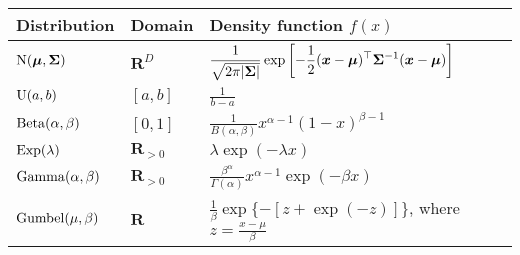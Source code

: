 \begingroup
\renewcommand*{\arraystretch}{1.5}
\begin{tabularx}{\linewidth}{llX}
  Distribution & Domain & Density function $f(x)$ \\
  \midrule
  \rule{0pt}{5ex}%
  $\mathrm{N}( \bm{\mu}, \bm{\Sigma} )$
    & $\mathbf{R}^D$
    & $\displaystyle \frac{1}{\sqrt{2 \pi \lvert\bm{\Sigma}\rvert}}
        \exp \left[ -\frac{1}{2} (\bm{x} - \bm{\mu})^\top \bm{\Sigma}^{-1} (\bm{x} - \bm{\mu}) \right]$ \\
  \rule{0pt}{5ex}%
  $\mathrm{U}( a, b )$
    & $[a, b]$
    & $\displaystyle \frac{1}{b - a}$ \\
  \rule{0pt}{5ex}%
  $\mathrm{Beta}( \alpha, \beta )$
    & $[0, 1]$
    & $\displaystyle \frac{1}{B(\alpha, \beta)} x^{\alpha - 1} (1-x)^{\beta - 1}$ \\
  $\mathrm{Exp}( \lambda )$
    & $\mathbf{R}_{>0}$
    & $\displaystyle \lambda \exp(- \lambda x)$ \\
  \rule{0pt}{5ex}%
  $\mathrm{Gamma}( \alpha, \beta )$
    & $\mathbf{R}_{>0}$
    & $\displaystyle \frac{\beta^\alpha}{\Gamma(\alpha)} x^{\alpha-1} \exp(- \beta x)$ \\
  \rule{0pt}{5ex}%
  $\mathrm{Gumbel}( \mu, \beta )$
    & $\mathbf{R}$
    & $\displaystyle \frac{1}{\beta} \exp \{ - [z + \exp(-z)]\}$, where $\displaystyle z = \frac{x - \mu}{\beta}$ \\
\end{tabularx}
\endgroup

